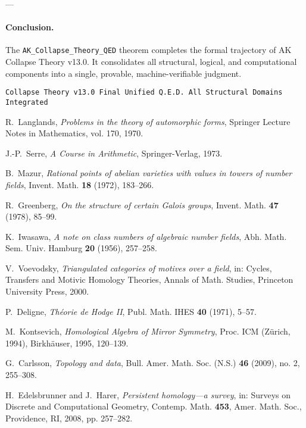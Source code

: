 \documentclass[11pt]{article}
\begin{document}
---

\paragraph{Conclusion.}
The \texttt{AK\_Collapse\_Theory\_QED} theorem completes the formal trajectory of AK Collapse Theory v13.0. It consolidates all structural, logical, and computational components into a single, provable, machine-verifiable judgment.

\begin{flushright}
\texttt{Collapse Theory v13.0 \quad Final Unified Q.E.D. \quad All Structural Domains Integrated}
\end{flushright}




\begin{thebibliography}{99}

R.~Langlands, \emph{Problems in the theory of automorphic forms}, Springer Lecture Notes in Mathematics, vol. 170, 1970.

J.-P.~Serre, \emph{A Course in Arithmetic}, Springer-Verlag, 1973.

B.~Mazur, \emph{Rational points of abelian varieties with values in towers of number fields}, Invent. Math. \textbf{18} (1972), 183–266.

R.~Greenberg, \emph{On the structure of certain Galois groups}, Invent. Math. \textbf{47} (1978), 85–99.

K.~Iwasawa, \emph{A note on class numbers of algebraic number fields}, Abh. Math. Sem. Univ. Hamburg \textbf{20} (1956), 257–258.

V.~Voevodsky, \emph{Triangulated categories of motives over a field}, in: Cycles, Transfers and Motivic Homology Theories, Annals of Math. Studies, Princeton University Press, 2000.

P.~Deligne, \emph{Théorie de Hodge II}, Publ. Math. IHES \textbf{40} (1971), 5–57.

M.~Kontsevich, \emph{Homological Algebra of Mirror Symmetry}, Proc. ICM (Zürich, 1994), Birkhäuser, 1995, 120–139.

G.~Carlsson, \emph{Topology and data}, Bull. Amer. Math. Soc. (N.S.) \textbf{46} (2009), no. 2, 255–308.

H.~Edelsbrunner and J.~Harer, \emph{Persistent homology—a survey}, in: Surveys on Discrete and Computational Geometry, Contemp. Math. \textbf{453}, Amer. Math. Soc., Providence, RI, 2008, pp. 257–282.


\end{thebibliography}
\end{document}

